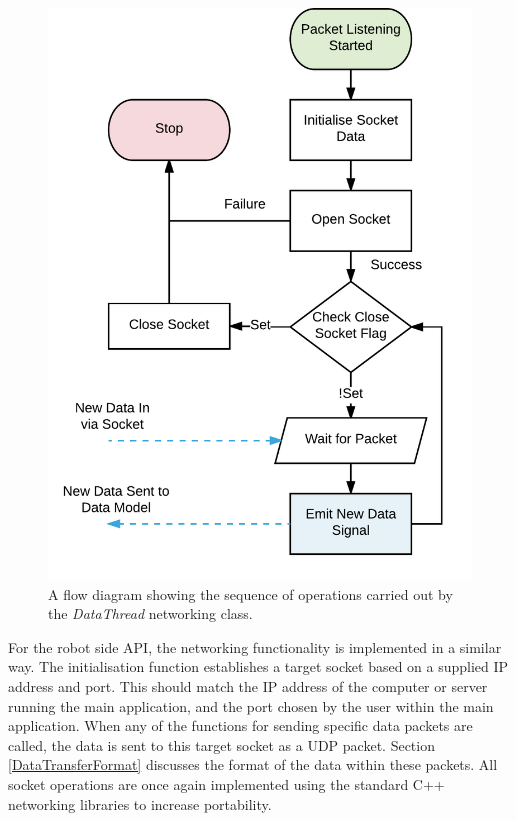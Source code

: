 \begin{figure}
	\centering
	\includegraphics[scale=1]{Figures/NetworkingFlow.png}
	\decoRule
	\caption[Networking Code Flow Diagram]{A flow diagram showing the sequence of operations carried out by the \textit{DataThread} networking class.}
	\label{fig:NetworkingFlow}
\end{figure}

For the robot side API, the networking functionality is implemented in a similar way. The initialisation function establishes a target socket based on a supplied IP address and port. This should match the IP address of the computer or server running the main application, and the port chosen by the user within the main application. When any of the functions for sending specific data packets are called, the data is sent to this target socket as a UDP packet. Section \ref{DataTransferFormat} discusses the format of the data within these packets. All socket operations are once again implemented using the standard C++ networking libraries to increase portability.

